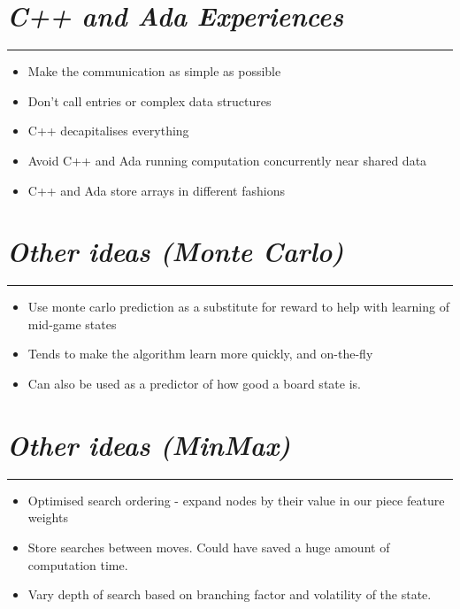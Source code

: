 \documentclass[10pt]{report}
\begin{document}
\section*{\emph{\textmd{C++ and Ada Experiences}}}
\hrule
    \begin{itemize}
  \item
    Make the communication as simple as possible
  \item
   Don't call entries or complex data structures
  \item
   C++ decapitalises everything
  \item
   Avoid C++ and Ada running computation concurrently near shared data
  \item
   C++ and Ada store arrays in different fashions
  \end{itemize}

\section*{\emph{Other ideas (Monte Carlo)}}
\hrule
    \begin{itemize}
  \item
    	Use monte carlo prediction as a substitute for reward to help with learning of mid-game states
  \item
	Tends to make the algorithm learn more quickly, and on-the-fly
  \item
	Can also be used as a predictor of how good a board state is.
  \end{itemize}

\section*{\emph{Other ideas (MinMax)}}
\hrule
    \begin{itemize}
  \item
    Optimised search ordering - expand nodes by their value in our piece feature weights
  \item
	Store searches between moves. Could have saved a huge amount of computation time.
  \item
	Vary depth of search based on branching factor and volatility of the state.
  \end{itemize}
\end{document}
